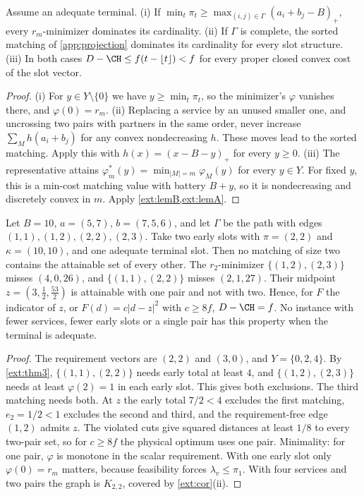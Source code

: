 \begin{corollary}\label{ext:cor}
Assume an adequate terminal.
(i) If $\min_t\pi_t\ge\max_{(i,j)\in\Gamma}(a_i+b_j-B)_+$, every
$r_m$-minimizer dominates its cardinality.
(ii) If $\Gamma$ is complete, the sorted matching of \cref{app:projection}
dominates its cardinality for every slot structure.
(iii) In both cases $D-\CH\le f(t-\lfloor t\rfloor)<f$ for every proper closed
convex cost of the slot vector.
\end{corollary}
\begin{proof}
(i) For $y\in Y\setminus\{0\}$ we have $y\ge\min_t\pi_t$, so the
minimizer's $\varphi$ vanishes there, and $\varphi(0)=r_m$.
(ii) Replacing a service by an unused smaller one, and uncrossing two pairs
with partners in the same order, never increase $\sum_Mh(a_i+b_j)$ for any
convex nondecreasing $h$. These moves lead to the sorted matching. Apply this
with $h(x)=(x-B-y)_+$ for every $y\ge0$.
(iii) The representative attains $\varphi^*_m(y)=\min_{|M|=m}\varphi_M(y)$
for every $y\in Y$. For fixed $y$, this is a min-cost matching value with
battery $B+y$, so it is nondecreasing and discretely convex in $m$. Apply
\cref{ext:lemB,ext:lemA}.
\end{proof}

\begin{proposition}\label{ext:ex1}
Let $B=10$, $a=(5,7)$, $b=(7,5,6)$, and let $\Gamma$ be the path with edges
$(1,1),(1,2),(2,2),(2,3)$. Take two early slots with $\pi=(2,2)$ and
$\kappa=(10,10)$, and one adequate terminal slot. Then no matching of size two
contains the attainable set of every other. The $r_2$-minimizer
$\{(1,2),(2,3)\}$ misses $(4,0,26)$, and $\{(1,1),(2,2)\}$ misses
$(2,1,27)$. Their midpoint $z=(3,\tfrac12,\tfrac{53}{2})$ is attainable with
one pair and not with two. Hence, for $F$ the indicator of $z$, or
$F(d)=c\lvert d-z\rvert^2$ with $c\ge 8f$, $D-\CH=f$. No instance with fewer
services, fewer early slots or a single pair has this property when the
terminal is adequate.
\end{proposition}
\begin{proof}
The requirement vectors are $(2,2)$ and $(3,0)$, and $Y=\{0,2,4\}$. By
\cref{ext:thm3}, $\{(1,1),(2,2)\}$ needs early total at least $4$, and
$\{(1,2),(2,3)\}$ needs at least $\varphi(2)=1$ in each early slot. This
gives both exclusions. The third matching needs both. At $z$ the early total
$7/2<4$ excludes the first matching, $e_2=1/2<1$ excludes the second and
third, and the requirement-free edge $(1,2)$ admits $z$. The violated cuts
give squared distances at least $1/8$ to every two-pair set, so for
$c\ge8f$ the physical optimum uses one pair. Minimality: for one pair,
$\varphi$ is monotone in the scalar requirement. With one early slot only
$\varphi(0)=r_m$ matters, because feasibility forces $\lambda_v\le\pi_1$.
With four services and two pairs the graph is $K_{2,2}$, covered by
\cref{ext:cor}(ii).
\end{proof}

